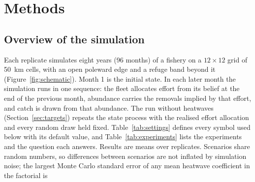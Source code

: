 \documentclass[11pt,a4paper]{article}
\begin{document}
\section{Methods}

\subsection{Overview of the simulation}
\label{sec:overview}

Each replicate simulates eight years (96 months) of a fishery on a $12\times12$ grid of 50~km cells, with an open poleward edge and a refuge band beyond it (Figure~\ref{fig:schematic}). Month 1 is the initial state. In each later month the simulation runs in one sequence: the fleet allocates effort from its belief at the end of the previous month, abundance carries the removals implied by that effort, and catch is drawn from that abundance. The run without heatwaves (Section~\ref{sec:targets}) repeats the state process with the realised effort allocation and every random draw held fixed. Table~\ref{tab:settings} defines every symbol used below with its default value, and Table~\ref{tab:experiments} lists the experiments and the question each answers. Results are means over replicates. Scenarios share random numbers, so differences between scenarios are not inflated by simulation noise; the largest Monte Carlo standard error of any mean heatwave coefficient in the factorial is %
\end{document}
